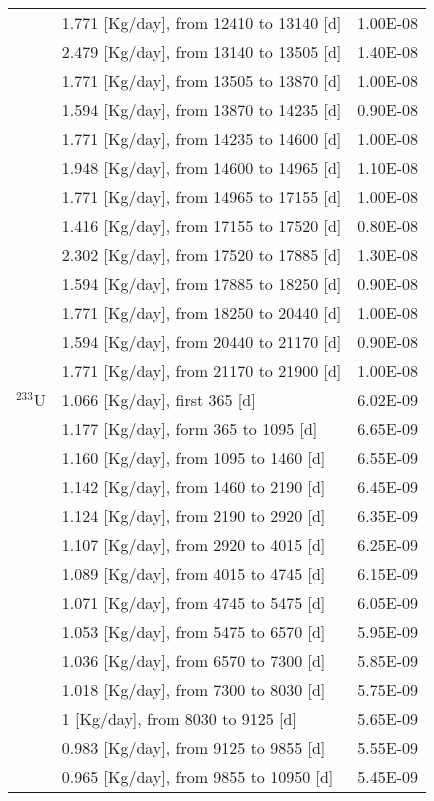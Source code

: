 \begin{longtable}{|p{}|p{}|p{}|}
		&  1.771   [Kg/day], from 12410 to 13140 [d]&		1.00E-08	 \\
		&  2.479  [Kg/day], from 13140 to 13505 [d]&		1.40E-08	 \\
		&  1.771 [Kg/day], from 13505 to 13870 [d]&		1.00E-08	 \\
		& 1.594   [Kg/day], from 13870 to 14235 [d]&		0.90E-08	 \\
		&  1.771   [Kg/day], from 14235 to 14600 [d]&		1.00E-08	 \\
		& 1.948  [Kg/day], from 14600 to 14965 [d]&		1.10E-08	 \\
		&  1.771   [Kg/day], from 14965 to 17155 [d]&		1.00E-08	 \\
		&  1.416  [Kg/day], from 17155 to 17520 [d]&		0.80E-08	 \\
		&  2.302  [Kg/day], from 17520 to 17885 [d]&		1.30E-08	 \\
		& 1.594  [Kg/day], from 17885 to 18250 [d]&		0.90E-08	 \\
		&   1.771 [Kg/day], from 18250 to 20440 [d]&		1.00E-08	 \\
		&  1.594  [Kg/day], from 20440 to 21170 [d]&		0.90E-08	 \\
		&  1.771 [Kg/day], from 21170 to 21900 [d]&		1.00E-08	 \\
		\hline
		$^{233}$U &  1.066 [Kg/day], first 365  [d]	&   6.02E-09  \\
		& 1.177 [Kg/day],  form 365 to 1095 [d] &	6.65E-09 \\
		&  1.160 [Kg/day], from 1095 to 1460 [d] &	6.55E-09 \\
		& 1.142   [Kg/day], from 1460 to 2190 [d] &	6.45E-09 \\
		& 1.124  [Kg/day], from 2190 to 2920 [d] &	6.35E-09 \\
		& 1.107 [Kg/day], from 2920 to 4015 [d] &	6.25E-09 \\
		&  1.089 [Kg/day], from 4015 to 4745 [d] &	6.15E-09 \\
		&  1.071  [Kg/day], from 4745 to 5475 [d] &	6.05E-09 \\
		& 1.053  [Kg/day], from 5475 to 6570 [d] &	5.95E-09 \\
		&  1.036  [Kg/day], from 6570 to 7300 [d] &	5.85E-09 \\
		&  1.018   [Kg/day], from 7300 to 8030 [d] &	5.75E-09 \\
		&  1   [Kg/day], from 8030 to 9125 [d] &	5.65E-09 \\
		&  0.983 [Kg/day], from 9125 to 9855 [d] &	5.55E-09 \\
		&  0.965  [Kg/day], from 9855 to 10950 [d] &	5.45E-09 \\

\end{longtable}
